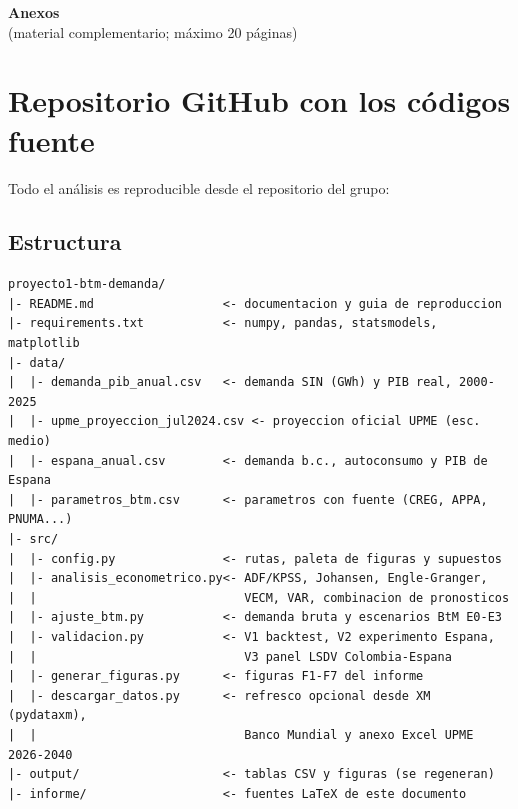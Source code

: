 \renewcommand{\thesection}{Anexo \Alph{section}}
\renewcommand{\thesubsection}{\Alph{section}.\arabic{subsection}}
\setcounter{section}{0}
\setcounter{table}{0}
\setcounter{figure}{0}

\begin{center}
{\Large\bfseries Anexos}\\[2pt]
{\small (material complementario; máximo 20 páginas)}
\end{center}

\section{Repositorio GitHub con los códigos fuente}
\label{anexo:repo}

Todo el análisis es reproducible desde el repositorio del grupo:

\begin{center}
\end{center}

\subsection{Estructura}
\begin{verbatim}
proyecto1-btm-demanda/
|- README.md                  <- documentacion y guia de reproduccion
|- requirements.txt           <- numpy, pandas, statsmodels, matplotlib
|- data/
|  |- demanda_pib_anual.csv   <- demanda SIN (GWh) y PIB real, 2000-2025
|  |- upme_proyeccion_jul2024.csv <- proyeccion oficial UPME (esc. medio)
|  |- espana_anual.csv        <- demanda b.c., autoconsumo y PIB de Espana
|  |- parametros_btm.csv      <- parametros con fuente (CREG, APPA, PNUMA...)
|- src/
|  |- config.py               <- rutas, paleta de figuras y supuestos
|  |- analisis_econometrico.py<- ADF/KPSS, Johansen, Engle-Granger,
|  |                             VECM, VAR, combinacion de pronosticos
|  |- ajuste_btm.py           <- demanda bruta y escenarios BtM E0-E3
|  |- validacion.py           <- V1 backtest, V2 experimento Espana,
|  |                             V3 panel LSDV Colombia-Espana
|  |- generar_figuras.py      <- figuras F1-F7 del informe
|  |- descargar_datos.py      <- refresco opcional desde XM (pydataxm),
|  |                             Banco Mundial y anexo Excel UPME 2026-2040
|- output/                    <- tablas CSV y figuras (se regeneran)
|- informe/                   <- fuentes LaTeX de este documento
\end{verbatim}

